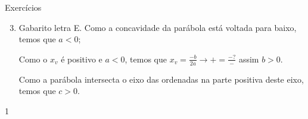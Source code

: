 \clearmargin
\begin{answer}{Exercícios}
{\exerciselist
\begin{enumerate}\setcounter{enumi}{2}
\item Gabarito letra E. Como a concavidade da parábola está voltada para baixo, temos que \(a<0\);

Como o \(x_v\) é positivo e \(a<0\), temos que \(x_v=\frac{-b}{2a}\to+=\frac{-?}{-}\) assim \(b>0\).

Como a parábola intersecta o eixo das ordenadas na parte positiva deste eixo, temos que \(c>0\).

\end{enumerate}
}1{}
\end{answer}



\label{\detokenize{AF209-7:sec-funcao-quadratica-explorando-max-min-can}}\label{\detokenize{AF209-7::doc}}\label{\detokenize{AF209-7:explorando-otimizacao-em-dominio-discreto-e-escalas-graficas}}\label{\detokenize{AF209-7:ativ-funcao-quadratica-aumento-passagem}}
